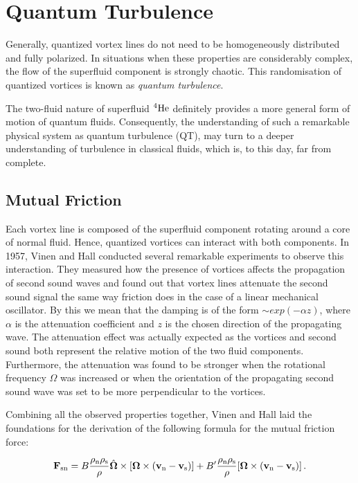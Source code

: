\section{Quantum Turbulence}

Generally, quantized vortex lines do not need to be homogeneously distributed and fully polarized. In situations when these properties are considerably complex, the flow of the superfluid component is strongly chaotic. This randomisation of quantized vortices is known as  \textit{quantum turbulence}.

The two-fluid nature of superfluid $ {}^4\mathrm{He} $ definitely provides a more general form of motion of quantum fluids. Consequently, the understanding of such a remarkable physical system as quantum turbulence (QT), may turn to a deeper understanding of turbulence in classical fluids, which is, to this day, far from complete.


\subsection*{Mutual Friction}

Each vortex line is composed of the superfluid component rotating around a core of normal fluid. Hence, quantized vortices can interact with both components. In 1957, Vinen and Hall conducted several remarkable experiments\cite{vinen1} to observe this interaction. They measured how the presence of vortices affects the propagation of second sound waves and found out that vortex lines attenuate the second sound signal the same way friction does in the case of a linear mechanical oscillator. By this we mean that the damping is of the form $\sim\!\unit{exp}(-\alpha z)$, where $\alpha$ is the attenuation coefficient and $z$ is the chosen direction of the propagating wave. The attenuation effect was actually expected as the vortices and second sound both represent the relative motion of the two fluid components. Furthermore, the attenuation was found to be stronger when the rotational frequency $\Omega$ was increased or when the orientation of the propagating second sound wave was set to be more perpendicular to the vortices.

Combining all the observed properties together, Vinen and Hall laid the foundations\cite{vinen2} for the derivation of the following formula for the mutual friction force:

\begin{equation}
\mathbf{F}_{\mathrm{sn}}
= B \frac{\rho_{\mathrm{n}} \rho_{\mathrm{s}}}{\rho}
\hat{\mathbf{\Omega}}
\times [\mathbf{\Omega}\times(\mathbf{v}_{\mathrm{n}}
- \mathbf{v}_{\mathrm{s}})]
+ B^{\prime} \frac{\rho_{\mathrm{n}} \rho_{\mathrm{s}}}{\rho}
[\mathbf{\Omega}\times(\mathbf{v}_{\mathrm{n}} - \mathbf{v}_{\mathrm{s}})]\,.
\label{mutual}
\end{equation}

